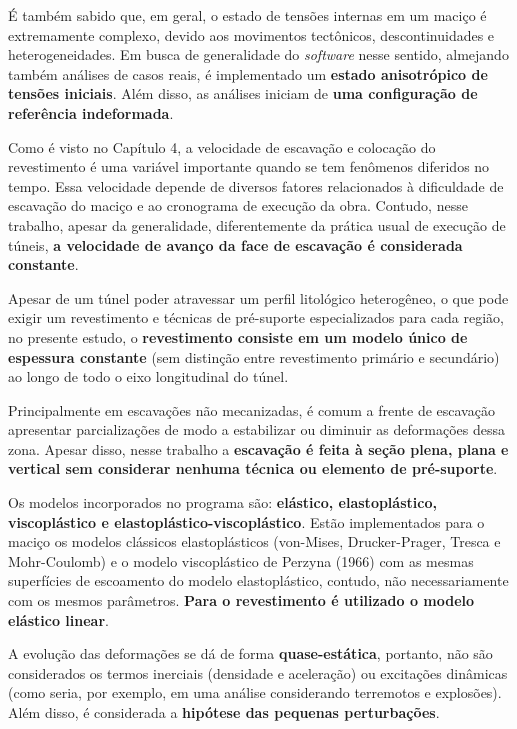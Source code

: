 É também sabido que, em geral, o estado de tensões internas em um maciço é extremamente complexo, devido aos movimentos tectônicos, descontinuidades e heterogeneidades. Em busca de generalidade do \textit{software} nesse sentido, almejando também análises de casos reais, é implementado um \textbf{estado anisotrópico de tensões iniciais}. Além disso, as análises iniciam de \textbf{uma configuração de referência indeformada}.

Como é visto no Capítulo 4, a velocidade de escavação e colocação do revestimento é uma variável importante quando se tem fenômenos diferidos no tempo. Essa velocidade depende de diversos fatores relacionados à dificuldade de escavação do maciço e ao cronograma de execução da obra. Contudo, nesse trabalho, apesar da generalidade, diferentemente da prática usual de execução de túneis, \textbf{a velocidade de avanço da face de escavação é considerada constante}.

Apesar de um túnel poder atravessar um perfil litológico heterogêneo, o que pode exigir um revestimento e técnicas de pré-suporte especializados para cada região, no presente estudo, o \textbf{revestimento consiste em um modelo único de espessura constante} (sem distinção entre revestimento primário e secundário) ao longo de todo o eixo longitudinal do túnel.

Principalmente em escavações não mecanizadas, é comum a frente de escavação apresentar parcializações de modo a estabilizar ou diminuir as deformações dessa zona. Apesar disso, nesse trabalho a \textbf{escavação é feita à seção plena, plana e vertical sem considerar nenhuma técnica ou elemento de pré-suporte}.

Os modelos incorporados no programa são: \textbf{elástico, elastoplástico, viscoplástico e elastoplástico-viscoplástico}. Estão implementados para o maciço os modelos clássicos elastoplásticos (von-Mises, Drucker-Prager, Tresca e Mohr-Coulomb) e o modelo viscoplástico de Perzyna (1966) com as mesmas superfícies de escoamento do modelo elastoplástico, contudo, não necessariamente com os mesmos parâmetros. \textbf{Para o revestimento é utilizado o modelo elástico linear}.

A evolução das deformações se dá de forma \textbf{quase-estática}, portanto, não são considerados os termos inerciais (densidade e aceleração) ou excitações dinâmicas (como seria, por exemplo, em uma análise considerando terremotos e explosões). Além disso, é considerada a \textbf{hipótese das pequenas perturbações}.

